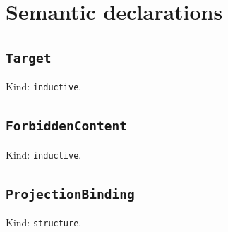 \documentclass[11pt]{article}
\begin{document}
\section*{Semantic declarations}
\subsection*{\texttt{Target}}
\noindent Kind: \texttt{inductive}.\par
\subsection*{\texttt{ForbiddenContent}}
\noindent Kind: \texttt{inductive}.\par
\subsection*{\texttt{ProjectionBinding}}
\noindent Kind: \texttt{structure}.\par
\end{document}
